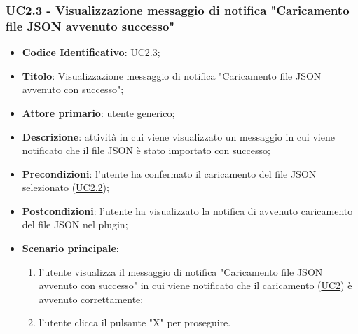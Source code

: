 		\label{par:UC2.3}
	\subsubsection{UC2.3 - Visualizzazione messaggio di notifica "Caricamento file JSON avvenuto successo"}
		\begin{itemize}
			\item\textbf{Codice Identificativo}: UC2.3;
			\item\textbf{Titolo}: Visualizzazione messaggio di notifica "Caricamento file JSON avvenuto con successo";
			\item\textbf{Attore primario}: utente generico;
			\item\textbf{Descrizione}: attività in cui viene visualizzato un messaggio in cui viene notificato che il file JSON è stato importato con successo;
			\item\textbf{Precondizioni}: l'utente ha confermato il caricamento del file JSON selezionato (\hyperref[par:UC2.2]{UC2.2});
			\item\textbf{Postcondizioni}: l'utente ha visualizzato la notifica di avvenuto caricamento del file JSON nel plugin;
			\item\textbf{Scenario principale}:
				\begin{enumerate}
					\item l'utente visualizza il messaggio di notifica "Caricamento file JSON avvenuto con successo" in cui viene notificato che il caricamento (\hyperref[par:UC2]{UC2}) è avvenuto correttamente;
					\item l'utente clicca il pulsante "X" per proseguire.		
				\end{enumerate}		
		\end{itemize}
		
		\label{par:UC2.4}
